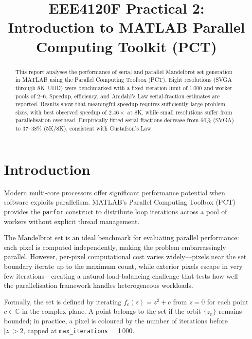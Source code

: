 \documentclass[conference]{IEEEtran}
\begin{document}
\title{EEE4120F Practical 2: Introduction to MATLAB Parallel
Computing Toolkit (PCT)}

\author{
\and
{}
}

\maketitle

\begin{abstract}
This report analyses the performance of serial and parallel Mandelbrot set
generation in MATLAB using the Parallel Computing Toolbox (PCT).  Eight
resolutions (SVGA through 8K~UHD) were benchmarked with a fixed iteration
limit of 1\,000 and worker pools of 2--6.  Speedup, efficiency, and
Amdahl's Law serial-fraction estimates are reported.  Results show that
meaningful speedup requires sufficiently large problem sizes, with best
observed speedup of $2.46\times$ at 8K, while small resolutions suffer from
parallelisation overhead.  Empirically fitted serial fractions decrease from
60\% (SVGA) to 37--38\% (5K/8K), consistent with Gustafson's Law.
\end{abstract}

\section{Introduction}
Modern multi-core processors offer significant performance potential when
software exploits parallelism.  MATLAB's Parallel Computing Toolbox (PCT)
provides the \texttt{parfor} construct to distribute loop iterations across
a pool of workers without explicit thread management.

The Mandelbrot set is an ideal benchmark for evaluating parallel performance:
each pixel is computed independently, making the problem embarrassingly
parallel.  However, per-pixel computational cost varies widely---pixels near
the set boundary iterate up to the maximum count, while exterior pixels escape
in very few iterations---creating a natural load-balancing challenge that
tests how well the parallelisation framework handles heterogeneous workloads.

Formally, the set is defined by iterating $f_c(z) = z^2 + c$ from $z = 0$
for each point $c \in \mathbb{C}$ in the complex plane.  A point belongs to
the set if the orbit $\{z_n\}$ remains bounded; in practice, a pixel is
coloured by the number of iterations before $|z| > 2$, capped at
\texttt{max\_iterations} = 1\,000.
\end{document}
